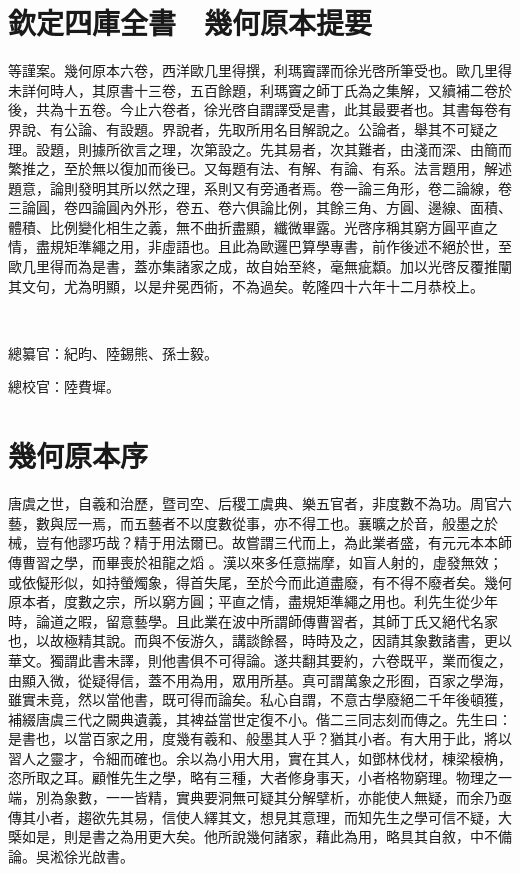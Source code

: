 \documentclass[12pt,b5paper,landscape]{article}
\def\CJKmovesymbol#1{\raise.35em\hbox{#1}}
\def\CJKmove{\let\CJKsymbol\CJKmovesymbol\let\CJKpunctsymbol\CJKmovesymbol}
\def\mincho{\CJKfamily{vert}}
\newcommand{\cname}[1]{{#1}}
\newcommand{\bname}[1]{{#1}}
\newcommand{\smallraise}[1]{\raisebox{3pt}{\scriptsize #1}}
\begin{document}
\CJKmove\mincho
\tableofcontents
\newpage
\section*{\mincho 欽定四庫全書　幾何原本提要}
\smallraise{臣}等謹案。\bname{幾何原本}六卷，西洋\cname{歐几里得}撰，\cname{利瑪竇}譯而\cname{徐光啓}所筆受也。\cname{歐几里得}未詳何時人，其原書十三卷，五百餘題，\cname{利瑪竇}之師\cname{丁}氏為之集解，又續補二卷於後，共為十五卷。今止六卷者，\cname{徐光啓}自謂譯受是書，此其最要者也。其書每卷有界說、有公論、有設題。界說者，先取所用名目解說之。公論者，舉其不可疑之理。設題，則據所欲言之理，次第設之。先其易者，次其難者，由淺而深、由簡而繁推之，至於無以復加而後已。又每題有法、有解、有論、有系。法言題用，解述題意，論則發明其所以然之理，系則又有旁通者焉。卷一論三角形，卷二論線，卷三論圓，卷四論圓內外形，卷五、卷六俱論比例，其餘三角、方圓、邊線、面積、體積、比例變化相生之義，無不曲折盡顯，纖微畢露。\cname{光啓}序稱其窮方圓平直之情，盡規矩準繩之用，非虛語也。且此為\cname{歐邏巴}算學專書，前作後述不絕於世，至\cname{歐几里得}而為是書，蓋亦集諸家之成，故自始至終，毫無疵纇。加以\cname{光啓}反覆推闡其文句，尤為明顯，以是弁冕西術，不為過矣。乾隆四十六年十二月恭校上。

~

總纂官：\smallraise{臣}紀昀、\smallraise{臣}陸錫熊、\smallraise{臣}孫士毅。

總校官：\smallraise{臣}陸費墀。
\newpage
\section*{\mincho 幾何原本序}

唐虞之世，自羲和治歷，暨司空、后稷工虞典、樂五官者，非度數不為功。周官六藝，數與㞐一焉，而五藝者不以度數從事，亦不得工也。襄曠之於音，般墨之於械，豈有他謬巧哉？精于用法爾已。故嘗謂三代而上，為此業者盛，有元元本本師傳曹習之學，而畢喪於祖龍之熖%
。漢以來多任意揣摩，如盲人射的，虛發無效；或依儗形似，如持螢燭象，得首失尾，至於今而此道盡廢，有不得不廢者矣。幾何原本者，度數之宗，所以窮方圓；平直之情，盡規矩準繩之用也。利先生從少年時，論道之暇，留意藝學。且此業在波中所謂師傳曹習者，其師丁氏又絕代名家也，以故極精其說。而與不佞游久，講談餘晷，時時及之，因請其象數諸書，更以華文。獨謂此書未譯，則他書俱不可得論。遂共翻其要約，六卷既平，業而復之，由顯入微，從疑得信，蓋不用為用，眾用所基。真可謂萬象之形囿，百家之學海，雖實未竟，然以當他書，既可得而論矣。私心自謂，不意古學廢絕二千年後頓獲，補綴唐虞三代之闕典遺義，其裨益當世定復不小。偕二三同志刻而傳之。先生曰：是書也，以當百家之用，度幾有羲和、般墨其人乎？猶其小者。有大用于此，將以習人之靈才，令細而確也。余以為小用大用，實在其人，如鄧林伐材，棟梁榱桷，恣所取之耳。顧惟先生之學，略有三種，大者修身事天，小者格物窮理。物理之一端，別為象數，一一皆精，實典要洞無可疑其分解擘析，亦能使人無疑，而余乃亟傳其小者，趨欲先其易，信使人繹其文，想見其意理，而知先生之學可信不疑，大㮣如是，則是書之為用更大矣。他所說幾何諸家，藉此為用，略具其自敘，中不備論。吳淞徐光啟書。
\end{document}
